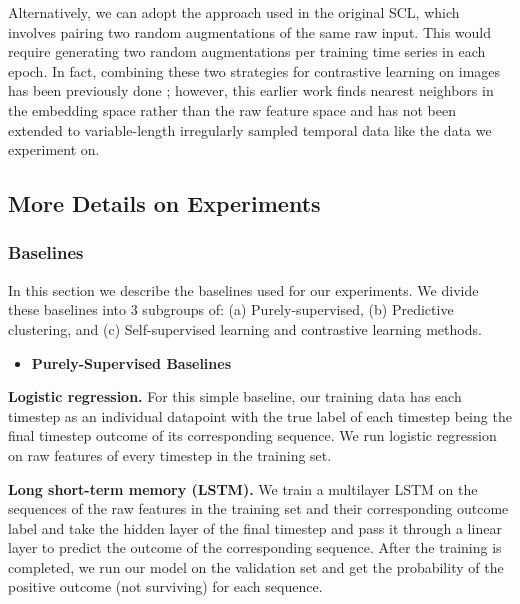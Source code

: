 \documentclass[pmlr,twocolumn,10pt]{jmlr} %
\begin{document}
Alternatively, we can adopt the approach used in the original SCL, which involves pairing two random augmentations of the same raw input. This would require generating two random augmentations per training time series in each epoch. In fact, combining these two strategies for contrastive learning on images has been previously done \citep{dwibedi2021little}; however, this earlier work finds nearest neighbors in the embedding space rather than the raw feature space and has not been extended to variable-length irregularly sampled temporal data like the data we experiment on.

\vspace{-.25em}
\subsection{More Details on Experiments}
\label{sec:experiment-details}

\subsubsection{Baselines}
\label{sec:baselines}
In this section we describe the baselines used for our experiments. We divide these baselines into 3 subgroups of: (a) Purely-supervised, (b) Predictive clustering, and (c) Self-supervised learning and contrastive learning methods.

\begin{itemize}
    \item \textbf{Purely-Supervised Baselines}
    \vspace{-0.5em}
\end{itemize}
\noindent
\textbf{Logistic regression.}
For this simple baseline, our training data has each timestep as an individual datapoint with the true label of each timestep being the final timestep outcome of its corresponding sequence. 
We run logistic regression on raw features of every timestep in the training set.

\vspace{.2em}
\noindent
\textbf{Long short-term memory (LSTM).}
We train a multilayer LSTM \citep{hochreiter1997long} on the sequences of the raw features in the training set and their corresponding outcome label and take the hidden layer of the final timestep and pass it through a linear layer to predict the outcome of the corresponding sequence.
After the training is completed, we run our model on the validation set and get the probability of the positive outcome (not surviving) for each sequence.
\end{document}
